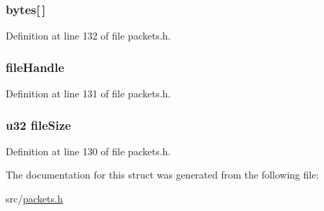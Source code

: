 \subsubsection[{bytes}]{ bytes\mbox{[}$\,$\mbox{]}}\label{struct_b_e_g_i_n___u_p_l_o_a_d___r_e_p_l_y_a1fdde1580342b6b1df0d8f5213c45107}


Definition at line 132 of file packets.\+h.

\hypertarget{struct_b_e_g_i_n___u_p_l_o_a_d___r_e_p_l_y_a1db5fbf603ad47a12353736f89c95073}{}
\subsubsection[{file\+Handle}]{ file\+Handle}\label{struct_b_e_g_i_n___u_p_l_o_a_d___r_e_p_l_y_a1db5fbf603ad47a12353736f89c95073}


Definition at line 131 of file packets.\+h.

\hypertarget{struct_b_e_g_i_n___u_p_l_o_a_d___r_e_p_l_y_afa8cac994ec0579d07285b61ffc8e0c7}{}
\subsubsection[{file\+Size}]{ {\bf u32} file\+Size}\label{struct_b_e_g_i_n___u_p_l_o_a_d___r_e_p_l_y_afa8cac994ec0579d07285b61ffc8e0c7}


Definition at line 130 of file packets.\+h.



The documentation for this struct was generated from the following file\+:\begin{DoxyCompactItemize}
\item 
src/\hyperlink{packets_8h}{packets.\+h}\end{DoxyCompactItemize}
